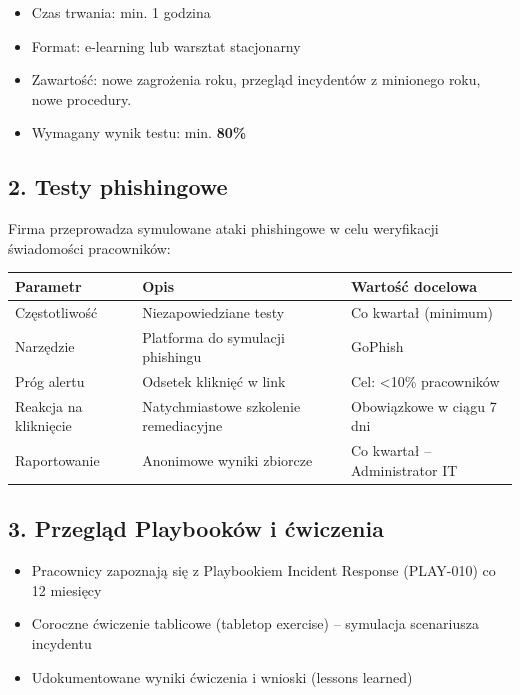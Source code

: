 \documentclass[12pt,a4paper]{article}
\providecommand{\tightlist}{\setlength{\itemsep}{0pt}\setlength{\parskip}{0pt}}
\begin{document}
\begin{itemize}
\tightlist
\item
  Czas trwania: min. 1 godzina
\item
  Format: e-learning lub warsztat stacjonarny
\item
  Zawartość: nowe zagrożenia roku, przegląd incydentów z minionego roku,
  nowe procedury.
\item
  Wymagany wynik testu: min. \textbf{80\%}
\end{itemize}

\subsection{2. Testy phishingowe}\label{testy-phishingowe}

Firma przeprowadza symulowane ataki phishingowe w celu weryfikacji
świadomości pracowników:

\begin{longtable}[]{@{}>{\raggedright\arraybackslash}p{}>{\raggedright\arraybackslash}p{}>{\raggedright\arraybackslash}p{}@{}}
\toprule\noalign{}
Parametr & Opis & Wartość docelowa \\
\midrule\noalign{}
\endhead
\bottomrule\noalign{}
\endlastfoot
Częstotliwość & Niezapowiedziane testy & Co kwartał (minimum) \\
Narzędzie & Platforma do symulacji phishingu & GoPhish \\
Próg alertu & Odsetek kliknięć w link & Cel: \textless10\%
pracowników \\
Reakcja na kliknięcie & Natychmiastowe szkolenie remediacyjne &
Obowiązkowe w ciągu 7 dni \\
Raportowanie & Anonimowe wyniki zbiorcze & Co kwartał -- Administrator IT \\
\end{longtable}

\subsection{3. Przegląd Playbooków i
ćwiczenia}\label{przeglux105d-playbookuxf3w-i-ux107wiczenia}

\begin{itemize}
\tightlist
\item
  Pracownicy zapoznają się z Playbookiem Incident Response (PLAY-010) co
  12 miesięcy
\item
  Coroczne ćwiczenie tablicowe (tabletop exercise) -- symulacja
  scenariusza incydentu
\item
  Udokumentowane wyniki ćwiczenia i wnioski (lessons learned)
\end{itemize}
\end{document}
